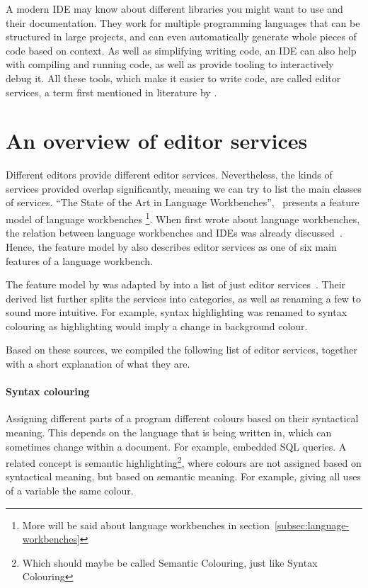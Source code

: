 A modern \ac{IDE} may know about different libraries you might want to use and their documentation.
They work for multiple programming languages that can be structured in large projects,
and can even automatically generate whole pieces of code based on context.
As well as simplifying writing code, an \ac{IDE} can also help with compiling and running code, as well as provide tooling to interactively debug it.
All these tools, which make it easier to write code, are called editor services, a term first mentioned in literature by \textcite{KatsKV08}.

\section{An overview of editor services}\label{sec:an-overview-of-editor-services}

Different editors provide different editor services.
Nevertheless, the kinds of services provided overlap significantly, meaning we can try to list the main classes of services.
``The State of the Art in Language Workbenches'',~\autocite{ErdwegSV13} presents a feature model of language workbenches
\footnote{More will be said about language workbenches in section~\ref{subsec:language-workbenches}}.
When \citeauthor{Fowler2004} first wrote about language workbenches, the relation between language workbenches and \acp{IDE} was already discussed~\autocite{Fowler2004}.
Hence, the feature model by \citeauthor{ErdwegSV13} also describes editor services as one of six main features of a language workbench.

The feature model by \citeauthor{ErdwegSV13} was adapted by \citeauthor{Pelsmaeker2018} into a list of just editor services~\autocite{Pelsmaeker2018}.
Their derived list further splits the services into categories, as well as renaming a few to sound more intuitive.
For example, syntax highlighting was renamed to syntax colouring as highlighting would imply a change in background colour.

Based on these sources, we compiled the following list of editor services, together with a short explanation of what they are.

\paragraph{Syntax colouring}
Assigning different parts of a program different colours based on their syntactical meaning.
This depends on the language that is being written in, which can sometimes change within a document.
For example, embedded SQL queries.
A related concept is semantic highlighting\footnote{Which should maybe be called Semantic Colouring, just like Syntax Colouring},
where colours are not assigned based on syntactical meaning, but based on semantic meaning.
For example, giving all uses of a variable the same colour.


